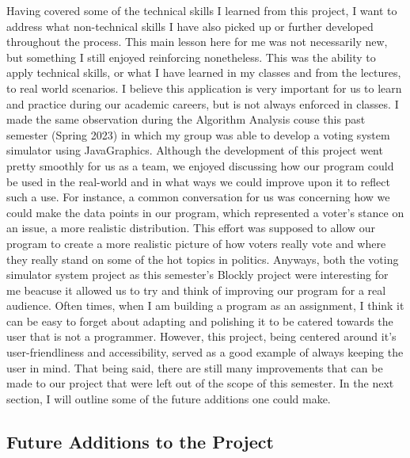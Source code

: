 \documentclass{article}
\theoremstyle{theorem}
\theoremstyle{definition}
\theoremstyle{remark}
\begin{document}
Having covered some of the technical skills I learned from this project, I want to address what non-technical skills I have also picked up or further developed throughout the process. This main lesson here for me was not necessarily new, but something I still enjoyed reinforcing nonetheless. This was the ability to apply technical skills, 
or what I have learned in my classes and from the lectures, to real world scenarios. I believe this application is very important for us to learn and practice during our academic careers, but is not always enforced in classes. I made the same observation during the Algorithm Analysis couse this past semester (Spring 2023) in which my group 
was able to develop a voting system simulator using JavaGraphics. Although the development of this project went pretty smoothly for us as a team, we enjoyed discussing how our program could be used in the real-world and in what ways we could improve upon it to reflect such a use. For instance, a common conversation for us was 
concerning how we could make the data points in our program, which represented a voter's stance on an issue, a more realistic distribution. This effort was supposed to allow our program to create a more realistic picture of how voters really vote and where they really stand on some of the hot topics in politics. Anyways, both the voting 
simulator system project as this semester's Blockly project were interesting for me beacuse it allowed us to try and think of improving our program for a real audience. Often times, when I am building a program as an assignment, I think it can be easy to forget about adapting and polishing it to be catered towards the user that is not a programmer. 
However, this project, being centered around it's user-friendliness and accessibility, served as a good example of always keeping the user in mind. That being said, there are still many improvements that can be made to our project that were left out of the scope of this semester. In the next section, I will outline some of the future additions one 
could make. \\


\subsection{Future Additions to the Project} 
\end{document}
